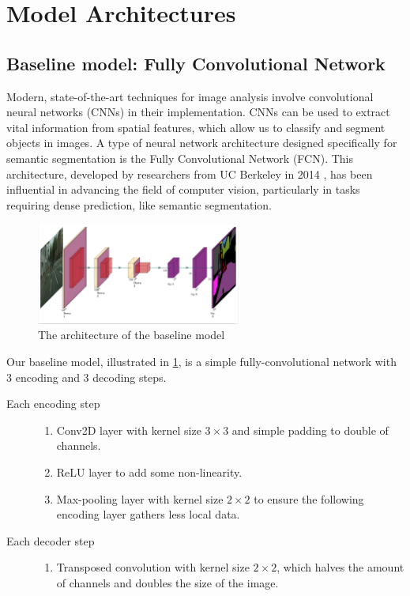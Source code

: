 \section{Model Architectures}
\subsection{Baseline model: Fully Convolutional Network }

Modern, state-of-the-art techniques for image analysis involve convolutional neural networks (CNNs) in their implementation. CNNs can be used to extract vital information from spatial features, which allow us to classify and segment objects in images. A type of neural network architecture designed specifically for semantic segmentation is the Fully Convolutional Network (FCN). This architecture, developed by researchers from UC Berkeley in 2014 \cite{DBLP:journals/corr/LongSD14}, has been influential in advancing the field of computer vision, particularly in tasks requiring dense prediction, like semantic segmentation. 

\begin{figure}
    \centering 
    \includegraphics[width=0.6\textwidth]{SimpleFCN.png}
    \caption{The architecture of the baseline model}
    \label{baseline_model}
\end{figure}

Our baseline model, illustrated in \cref{baseline_model}, is a simple fully-convolutional network with 3 encoding and 3 decoding steps.

\begin{description}
	\item[Each encoding step] \phantom{hello}
		\begin{enumerate}
			\item Conv2D layer with kernel size $3 \times 3$ and simple padding to double of channels.
			\item ReLU layer to add some non-linearity.
			\item Max-pooling layer with kernel size $2 \times 2$ to ensure the following encoding layer gathers less local data.
		\end{enumerate}
	\item[Each decoder step] \phantom{hello}
		\begin{enumerate}
			\item Transposed convolution with kernel size $2 \times 2$, which halves the amount of channels and doubles the size of the image.
		\end{enumerate}
\end{description}

